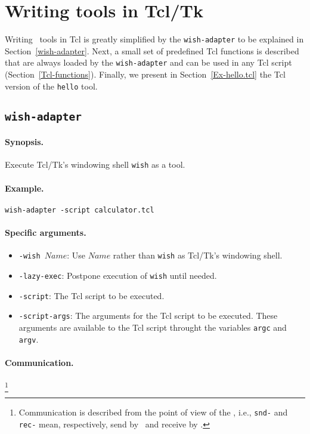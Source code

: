 
\section{\label{ToolsInTcl}Writing tools in Tcl/Tk}

Writing \TB\ tools in Tcl is greatly simplified by the {\tt wish-adapter}
to be explained in Section~\ref{wish-adapter}.
Next, a small set of predefined Tcl functions is described that are
always loaded by the {\tt wish-adapter} and can be used in any Tcl script
(Section~\ref{Tcl-functions}).
Finally, we present in Section~\ref{Ex-hello.tcl} the Tcl version
of the {\tt hello} tool.

\subsection{\label{wish-adapter}{\tt wish-adapter}}

\paragraph{Synopsis.} Execute Tcl/Tk's windowing shell {\tt wish} as a tool.

\paragraph{Example.} {\tt wish-adapter -script calculator.tcl}

\paragraph{Specific arguments.}
\begin{itemize}
\item {\tt -wish $Name$}: Use $Name$ rather than {\tt wish} as Tcl/Tk's windowing shell.
\item {\tt -lazy-exec}: Postpone execution of {\tt wish} until needed.
\item {\tt -script}: The Tcl script to be executed.
\item {\tt -script-args}: The arguments for the Tcl script to be executed.
      These arguments are available to the Tcl script throught the variables
      {\tt argc} and {\tt argv}.
\end{itemize}

\paragraph{Communication.} \hspace{-0.3cm}\footnote{Communication is described
from the point of view of the \TB, i.e., {\tt snd-} and {\tt rec-}
mean, respectively, send by \TB\ and receive by \TB.}

